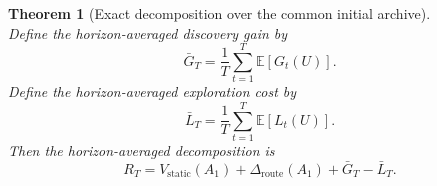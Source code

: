 \documentclass{article} %
\newtheorem{theorem}{Theorem}
\begin{document}
\begin{theorem}[Exact decomposition over the common initial archive]
\begin{equation}
\end{equation}
Define the horizon-averaged discovery gain by
\begin{equation}
\label{eq:app-thm-barg}
\bar G_T
=
\frac{1}{T}\sum_{t=1}^{T}\mathbb{E}[G_t(U)].
\end{equation}
Define the horizon-averaged exploration cost by
\begin{equation}
\label{eq:app-thm-barl}
\bar L_T
=
\frac{1}{T}\sum_{t=1}^{T}\mathbb{E}[L_t(U)].
\end{equation}
Then the horizon-averaged decomposition is
\begin{equation}
\label{eq:app-decomp-bound}
R_T
=
V_{\mathrm{static}}(A_1)
+
\Delta_{\mathrm{route}}(A_1)
+
\bar G_T
-
\bar L_T.
\end{equation}
\end{theorem}
\end{document}
